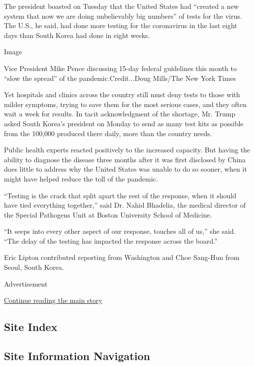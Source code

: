 The president boasted on Tuesday that the United States had ``created a
new system that now we are doing unbelievably big numbers'' of tests for
the virus. The U.S., he said, had done more testing for the coronavirus
in the last eight days than South Korea had done in eight weeks.

Image

Vice President Mike Pence discussing 15-day federal guidelines this
month to ``slow the spread'' of the pandemic.Credit...Doug Mills/The New
York Times

Yet hospitals and clinics across the country still must deny tests to
those with milder symptoms, trying to save them for the most serious
cases, and they often wait a week for results. In tacit acknowledgment
of the shortage, Mr. Trump asked South Korea's president on Monday to
send as many test kits as possible from the 100,000 produced there
daily, more than the country needs.

Public health experts reacted positively to the increased capacity. But
having the ability to diagnose the disease three months after it was
first disclosed by China does little to address why the United States
was unable to do so sooner, when it might have helped reduce the toll of
the pandemic.

``Testing is the crack that split apart the rest of the response, when
it should have tied everything together,'' said Dr. Nahid Bhadelia, ​the
medical director of the Special Pathogens Unit at Boston University
School of Medicine.

``It seeps into every other aspect of our response, touches all of us,''
she said. ``The delay of the testing has impacted the response across
the board.''

Eric Lipton contributed reporting from Washington and Choe Sang-Hun from
Seoul, South Korea.

Advertisement

\protect\hyperlink{after-bottom}{Continue reading the main story}

\hypertarget{site-index}{%
\subsection{Site Index}\label{site-index}}

\hypertarget{site-information-navigation}{%
\subsection{Site Information
Navigation}\label{site-information-navigation}}

